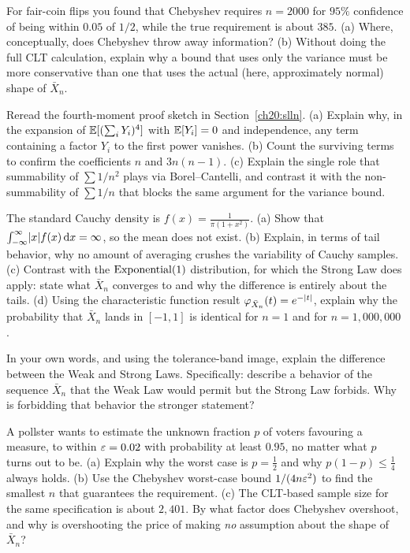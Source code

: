 \begin{exercise}
For fair-coin flips you found that Chebyshev requires $n=2000$ for $95\%$ confidence of being within $0.05$ of $1/2$, while the true requirement is about $385$. (a) Where, conceptually, does Chebyshev throw away information? (b) Without doing the full CLT calculation, explain why a bound that uses only the variance must be more conservative than one that uses the actual (here, approximately normal) shape of $\bar X_n$.
\end{exercise}

\begin{exercise}
Reread the fourth-moment proof sketch in Section~\ref{ch20:slln}. (a) Explain why, in the expansion of $\operatorname{\mathbb{E}}[(\sum_i Y_i)^4]$ with $\operatorname{\mathbb{E}}[Y_i]=0$ and independence, any term containing a factor $Y_i$ to the first power vanishes. (b) Count the surviving terms to confirm the coefficients $n$ and $3n(n-1)$. (c) Explain the single role that summability of $\sum 1/n^2$ plays via Borel--Cantelli, and contrast it with the non-summability of $\sum 1/n$ that blocks the same argument for the variance bound.
\end{exercise}

\begin{exercise}
The standard Cauchy density is $f(x)=\frac{1}{\pi(1+x^2)}$. (a) Show that $\int_{-\infty}^{\infty}\lvert x\rvert f(x)\,\mathrm{d} x=\infty$, so the mean does not exist. (b) Explain, in terms of tail behavior, why no amount of averaging crushes the variability of Cauchy samples. (c) Contrast with the $\operatorname{Exponential}(1)$ distribution, for which the Strong Law does apply: state what $\bar X_n$ converges to and why the difference is entirely about the tails. (d) Using the characteristic function result $\varphi_{\bar X_n}(t) = e^{-\lvert t\rvert}$, explain why the probability that $\bar X_n$ lands in $[-1, 1]$ is identical for $n=1$ and for $n=1{,}000{,}000$.
\end{exercise}

\begin{exercise}
In your own words, and using the tolerance-band image, explain the difference between the Weak and Strong Laws. Specifically: describe a behavior of the sequence $\bar X_n$ that the Weak Law would permit but the Strong Law forbids. Why is forbidding that behavior the stronger statement?
\end{exercise}

\begin{exercise}
A pollster wants to estimate the unknown fraction $p$ of voters favouring a measure, to within $\varepsilon = 0.02$ with probability at least $0.95$, no matter what $p$ turns out to be. (a) Explain why the worst case is $p=\tfrac12$ and why $p(1-p)\le\tfrac14$ always holds. (b) Use the Chebyshev worst-case bound $1/(4n\varepsilon^2)$ to find the smallest $n$ that guarantees the requirement. (c) The CLT-based sample size for the same specification is about $2{,}401$. By what factor does Chebyshev overshoot, and why is overshooting the price of making \emph{no} assumption about the shape of $\bar X_n$?
\end{exercise}

